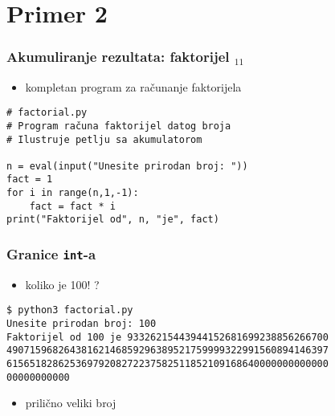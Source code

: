 \documentclass[utf8,compress]{beamer}
\begin{document}

\section{Primer 2}


\begin{frame}[fragile]
  \frametitle{Akumuliranje rezultata: faktorijel $_{11}$}
  \begin{itemize}
    \item kompletan program za računanje faktorijela
  \end{itemize}
\begin{verbatim}
# factorial.py
# Program računa faktorijel datog broja
# Ilustruje petlju sa akumulatorom

n = eval(input("Unesite prirodan broj: "))
fact = 1
for i in range(n,1,-1): 
    fact = fact * i
print("Faktorijel od", n, "je", fact)
\end{verbatim}
\end{frame}

\begin{frame}[fragile]
  \frametitle{Granice \texttt{int}-a}
  \begin{itemize}
    \item koliko je 100! ?
  \end{itemize}
\begin{verbatim}
$ python3 factorial.py
Unesite prirodan broj: 100
Faktorijel od 100 je 93326215443944152681699238856266700
49071596826438162146859296389521759999322991560894146397
61565182862536979208272237582511852109168640000000000000
00000000000
\end{verbatim}
  \begin{itemize}
    \item prilično veliki broj
  \end{itemize}
\end{frame}
\end{document}

